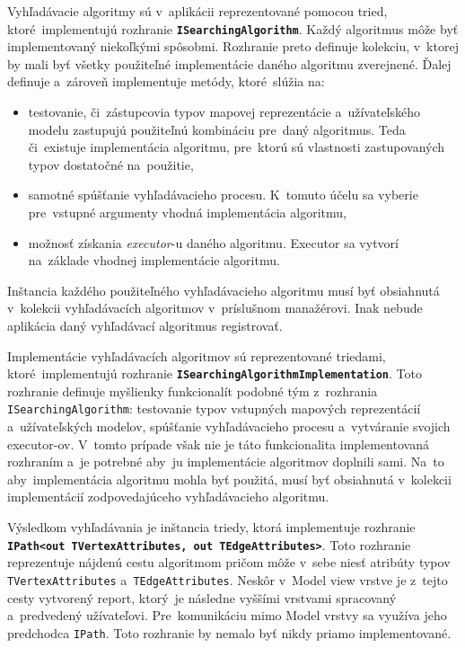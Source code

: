 \bigskip

Vyhľadávacie algoritmy sú v~aplikácii reprezentované pomocou tried, ktoré~implementujú rozhranie \textbf{\texttt{ISearchingAlgorithm}}. Každý algoritmus môže byť implementovaný niekoľkými spôsobmi. Rozhranie preto definuje kolekciu, v~ktorej by mali byť všetky použiteľné implementácie daného algoritmu zverejnené. Ďalej definuje a~zároveň implementuje metódy, ktoré~slúžia na:
\begin{itemize}
    \item testovanie, či~zástupcovia typov mapovej reprezentácie a~užívateľského modelu zastupujú použiteľnú kombináciu pre~daný algoritmus. Teda či~existuje implementácia algoritmu, pre~ktorú sú vlastnosti zastupovaných typov dostatočné na~použitie, 
    \item samotné spúšťanie vyhľadávacieho procesu. K~tomuto účelu sa vyberie pre~vstupné argumenty vhodná implementácia algoritmu,
    \item možnosť získania \textit{executor}-u daného algoritmu. Executor sa vytvorí na~základe vhodnej implementácie algoritmu.
\end{itemize}
Inštancia každého použiteľného vyhľadávacieho algoritmu musí byť obsiahnutá v~kolekcii vyhľadávacích algoritmov v~príslušnom manažérovi. Inak nebude aplikácia daný vyhľadávací algoritmus registrovať. 

Implementácie vyhľadávacích algoritmov sú reprezentované triedami, ktoré~implementujú rozhranie \textbf{\texttt{ISearchingAlgorithmImplementation}}. Toto rozhranie definuje myšlienky funkcionalít podobné tým z~rozhrania \texttt{ISearchingAlgorithm}: testovanie typov vstupných mapových reprezentácií a~užívateľských modelov, spúšťanie vyhľadávacieho procesu a~vytváranie svojich executor-ov. V~tomto prípade však nie je táto funkcionalita implementovaná rozhraním a~je potrebné aby~ju implementácie algoritmov doplnili sami. Na~to aby~implementácia algoritmu mohla byť použitá, musí byť obsiahnutá v~kolekcii implementácií zodpovedajúceho vyhľadávacieho algoritmu. 

Výsledkom vyhľadávania je inštancia triedy, ktorá implementuje rozhranie \textbf{\texttt{IPath<out TVertexAttributes, out TEdgeAttributes>}}. Toto rozhranie reprezentuje nájdenú cestu algoritmom pričom môže v~sebe niesť atribúty typov \texttt{TVertexAttributes} a~\texttt{TEdgeAttributes}. Neskôr v~Model view vrstve je z~tejto cesty vytvorený report, ktorý~je následne vyššími vrstvami spracovaný a~predvedený užívateľovi. Pre~komunikáciu mimo Model vrstvy sa využíva jeho predchodca \texttt{IPath}. Toto rozhranie by nemalo byť nikdy priamo implementované. 

